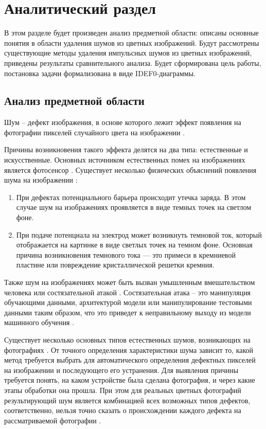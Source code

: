 \section{Аналитический раздел}
В этом разделе будет произведен анализ предметной области: описаны основные понятия в области удаления шумов из цветных изображений.
Будут рассмотрены существующие методы удаления импульсных шумов из цветных изображений, приведены результаты сравнительного анализа.
Будет сформирована цель работы, постановка задачи формализована в виде IDEF0-диаграммы.

\subsection{Анализ предметной области}
Шум -- дефект изображения, в основе которого лежит эффект появления на фотографии пикселей случайного цвета на изображении \cite{shum}. 

Причины возникновения такого эффекта делятся на два типа: естественные и искусственные.
Основных источником естественных помех на изображениях является фотосенсор \cite{shum}.
Существует несколько физических объяснений появления шума на изображении \cite{causes}:
\begin{enumerate}
	\item При дефектах потенциального барьера происходит утечка заряда. В этом случае шум на изображениях проявляется в виде темных точек на светлом фоне.
	\item При подаче потенциала на электрод может возникнуть темновой ток, который отображается на картинке в виде светлых точек на темном фоне. Основная причина возникновения темнового тока — это примеси в кремниевой пластине или повреждение кристаллической решетки кремния. 
\end{enumerate}

Также шум на изображениях может быть вызван умышленным вмешательством человека или состязательной атакой \cite{impact}. 
Состязательная атака – это манипуляция обучающими данными, архитектурой модели или манипулирование тестовыми данными таким
образом, что это приведет к неправильному выходу из модели машинного обучения \cite{impact}.


Существует несколько основных типов естественных шумов, возникающих на фотографиях \cite{filterTechincs}.
От точного определения характеристики шума зависит то, какой метод требуется выбрать для автоматического определения дефектных пикселей на изображении и последующего его устранения.
Для выявления причины требуется понять, на каком устройстве была сделана фотография, и через какие этапы обработки она прошла.
При этом для реальных цветных фотографий результирующий шум является комбинацией всех возможных типов дефектов, соответственно, нельзя точно сказать о происхождении каждого дефекта на рассматриваемой фотографии \cite{mix}.

